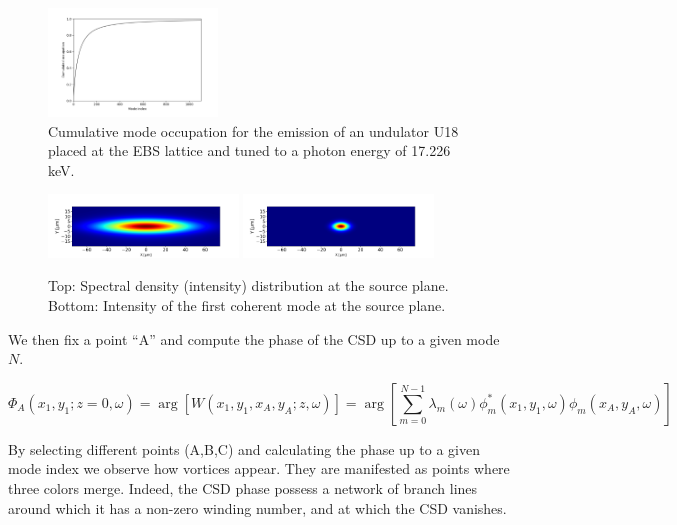 \documentclass[a4paper,10pt]{article}
\begin{document}
\begin{figure}\label{cumulative_mode_occupation}
\caption{Cumulative mode occupation for the emission of an undulator U18 placed at the EBS lattice and tuned to a photon energy of 17.226 keV.}
\includegraphics[width=0.4\textwidth]{Figures/vx_cumulated.png}
\end{figure}

\begin{figure}\label{spectral_density}%
\caption{Top: Spectral density (intensity) distribution at the source plane. Bottom: Intensity of the first coherent mode at the source plane.}
\includegraphics[width=0.45\textwidth]{Figures/spectral_density_upto1099.png}
\includegraphics[width=0.45\textwidth]{Figures/spectral_density_upto0.png}
\end{figure}

We then fix a point ``A'' and compute the phase of the CSD up to a given mode $N$. 

\begin{equation}\label{phase_of_W}
\Phi_A(x_1,y_1;z=0,\omega)=\arg[W(x_1,y_1,x_A,y_A;z,\omega)]=\arg[
\sum_{m=0}^{N-1} \lambda_m(\omega)
\phi_m^*(x_1,y_1,\omega)
\phi_m(x_A,y_A, \omega)]
\end{equation}

By selecting different points (A,B,C) and calculating the phase up to a given mode index we observe how vortices appear. They are manifested as points where three colors merge.  Indeed, the CSD phase possess a network of branch lines around which it has a non-zero winding number, and at which the CSD vanishes.
\end{document}
